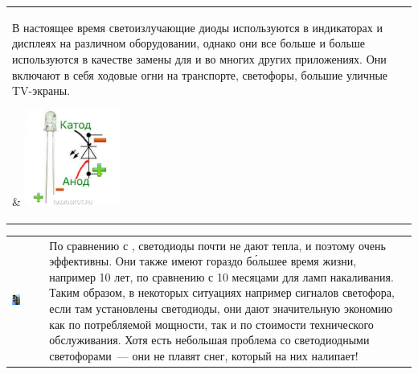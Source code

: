
\noindent
\begin{tabular}{p{}p{}}
\noindent\parbox[b]{0.65\textwidth}{В настоящее время светоизлучающие диоды
используются в индикаторах и дисплеях на различном оборудовании, однако они все
больше и больше используются в качестве замены для  и  во многих других приложениях. Они включают в себя ходовые огни
на транспорте, светофоры,  большие уличные TV-экраны.}&
\includegraphics[width=0.25\textwidth]{bcollis/led.jpeg}
\\
\end{tabular}

\noindent
\begin{tabular}{p{} p{}}
\noindent\includegraphics[width=0.3\textwidth]{bcollis/ledtraffic.jpeg}&
\noindent\parbox[b]{0.65\textwidth}{По сравнению с ,
светодиоды почти не дают тепла, и поэтому очень эффективны. Они также имеют
гораздо б\'{о}льшее время жизни, например 10 лет, по сравнению с 10 месяцами для
ламп накаливания. Таким образом, в некоторых ситуациях например сигналов
светофора, если там установлены светодиоды, они дают значительную экономию как
по потребляемой мощности, так и по стоимости технического обслуживания. Хотя
есть небольшая проблема со светодиодными светофорами\ --- они не плавят снег,
который на них налипает!}\\
\end{tabular}
